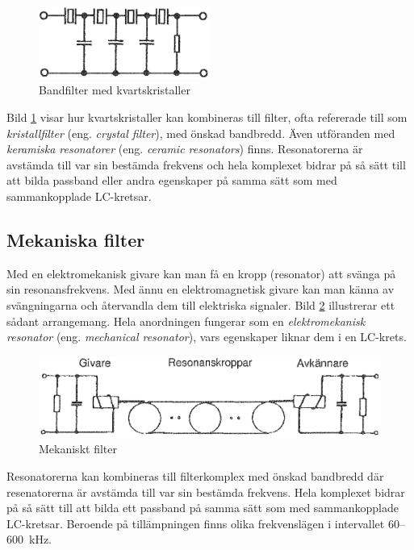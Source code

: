 \begin{figure}
\includegraphics[width=0.5\textwidth]{images/cropped_pdfs/bild_2_3-29.pdf}
\caption{Bandfilter med kvartskristaller}
\label{fig:BildII3-29}
\end{figure}

Bild \ref{fig:BildII3-29} visar hur kvartskristaller kan kombineras till
filter, ofta refererade till som \emph{kristallfilter} (eng.
\emph{crystal filter}), med önskad bandbredd.
Även utföranden med \emph{keramiska resonatorer} (eng.
\emph{ceramic resonators}) finns.
Resonatorerna är avstämda till var sin bestämda frekvens och hela komplexet
bidrar på så sätt till att bilda passband eller andra egenskaper på samma sätt
som med sammankopplade LC-kretsar.

\subsection{Mekaniska filter}

Med en elektromekanisk givare kan man få en kropp (resonator) att svänga på sin
resonansfrekvens.
Med ännu en elektromagnetisk givare kan man känna av svängningarna och
återvandla dem till elektriska signaler.
Bild \ref{fig:BildII3-30} illustrerar ett sådant arrangemang.
Hela anordningen fungerar som en \emph{elektromekanisk resonator} (eng.
\emph{mechanical resonator}), vars egenskaper liknar dem i en LC-krets.

\begin{figure}
\includegraphics[width=\textwidth]{images/cropped_pdfs/bild_2_3-30.pdf}
\caption{Mekaniskt filter}
\label{fig:BildII3-30}
\end{figure}

Resonatorerna kan kombineras till filterkomplex med önskad bandbredd där
resenatorerna är avstämda till var sin bestämda frekvens.
Hela komplexet bidrar på så sätt till att bilda ett passband på samma sätt som
med sammankopplade LC-kretsar.
Beroende på tillämpningen finns olika frekvenslägen i intervallet 60--600~kHz.

